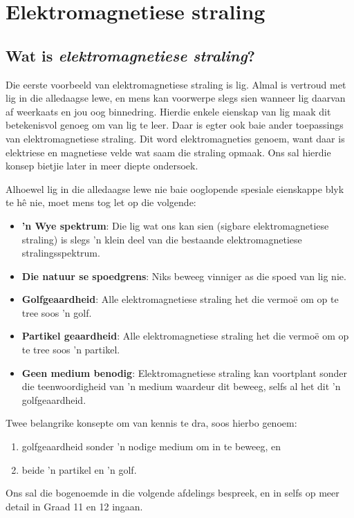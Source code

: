 \chapter{Elektromagnetiese stra\-ling}
    \setcounter{figure}{1}
    \setcounter{subfigure}{1}
    \label{459e2bef85baf867f5850bc8338cad3a}
         \section{Wat is \textsl{elektromagnetiese straling}?}
    \nopagebreak
Die eerste voorbeeld van elektromagnetiese straling is lig. Almal is vertroud met lig in die alledaagse lewe, en mens kan voorwerpe slegs sien wanneer lig daarvan af weerkaats en jou oog binnedring. Hierdie enkele eienskap van lig maak dit betekenisvol genoeg om van lig te leer. Daar is egter ook baie ander toepassings van e\-lek\-tro\-mag\-ne\-tie\-se straling. Dit word elektromagneties genoem, want daar is elektriese en magnetiese velde wat saam die straling opmaak. Ons sal hierdie konsep bietjie later in meer diepte ondersoek. 


Alhoewel lig in die alledaagse lewe nie baie ooglopende spesiale eienskappe blyk te h\^e nie, moet mens tog let op die volgende: 
\begin{itemize}
 \item \textbf{'n Wye spektrum}: Die lig wat ons kan sien (sigbare e\-lek\-tro\-mag\-ne\-tie\-se straling) is slegs 'n klein deel van die bestaande e\-lek\-tro\-mag\-ne\-tie\-se stralingsspektrum. 
 \item \textbf{Die natuur se spoedgrens}: Niks beweeg vinniger as die spoed van lig nie.  
 \item \textbf{Golfgeaardheid}: Alle e\-lek\-tro\-mag\-ne\-tie\-se straling het die vermo\"e om op te tree soos 'n golf. 
 \item \textbf{Partikel geaardheid}: Alle e\-lek\-tro\-mag\-ne\-tie\-se straling het die vermo\"e om op te tree soos 'n partikel.
 \item \textbf{Geen medium benodig}: E\-lek\-tro\-mag\-ne\-tie\-se straling kan voortplant sonder die teenwoordigheid van 'n medium waardeur dit beweeg, selfs al het dit 'n golfgeaardheid.
\end{itemize}

Twee belangrike konsepte om van kennis te dra, soos hierbo genoem:
\begin{enumerate}[noitemsep, label=\textbf{\arabic*}. ]
 \item golfgeaardheid sonder 'n nodige medium om in te beweeg, en 
 \item beide 'n partikel en 'n golf. 
\end{enumerate}
Ons sal die bogenoemde in die volgende afdelings bespreek, en in selfs op meer detail in Graad 11 en 12 ingaan. 

